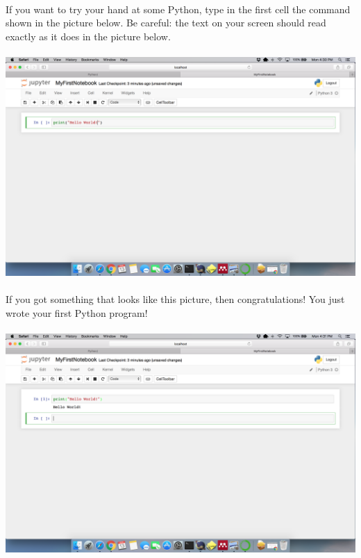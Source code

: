 \documentclass[]{article}
\begin{document}
\clearpage
\paragraph{}
If you want to try your hand at some Python, type in the first cell the command shown in the picture below. Be careful: the text on your screen should read exactly as it does in the picture below.
\paragraph{}
\begin{centering}
    \centerline{\includegraphics[scale=0.25]{Screenshot_23.png}}
\end{centering}

\paragraph{}
If you got something that looks like this picture, then congratulations! You just wrote your first Python program!
\paragraph{}
\begin{centering}
    \centerline{\includegraphics[scale=0.25]{Screenshot_24.png}}
\end{centering}
\end{document}
